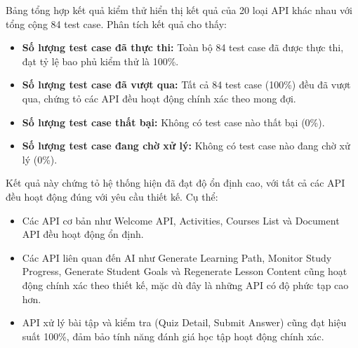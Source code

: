 Bảng tổng hợp kết quả kiểm thử hiển thị kết quả của 20 loại API khác nhau với tổng cộng 84 test case. Phân tích kết quả cho thấy:

\begin{itemize}
    \item \textbf{Số lượng test case đã thực thi:} Toàn bộ 84 test case đã được thực thi, đạt tỷ lệ bao phủ kiểm thử là 100\%.
    \item \textbf{Số lượng test case đã vượt qua:} Tất cả 84 test case (100\%) đều đã vượt qua, chứng tỏ các API đều hoạt động chính xác theo mong đợi.
    \item \textbf{Số lượng test case thất bại:} Không có test case nào thất bại (0\%).
    \item \textbf{Số lượng test case đang chờ xử lý:} Không có test case nào đang chờ xử lý (0\%).
\end{itemize}

Kết quả này chứng tỏ hệ thống hiện đã đạt độ ổn định cao, với tất cả các API đều hoạt động đúng với yêu cầu thiết kế. Cụ thể:

\begin{itemize}
    \item Các API cơ bản như Welcome API, Activities, Courses List và Document API đều hoạt động ổn định.
    \item Các API liên quan đến AI như Generate Learning Path, Monitor Study Progress, Generate Student Goals và Regenerate Lesson Content cũng hoạt động chính xác theo thiết kế, mặc dù đây là những API có độ phức tạp cao hơn.
    \item API xử lý bài tập và kiểm tra (Quiz Detail, Submit Answer) cũng đạt hiệu suất 100\%, đảm bảo tính năng đánh giá học tập hoạt động chính xác.
\end{itemize}
